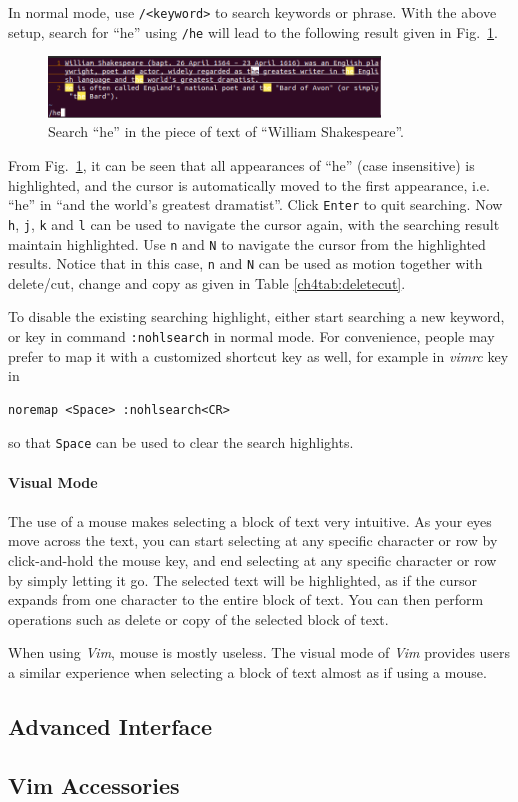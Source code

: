 In normal mode, use \verb|/<keyword>| to search keywords or phrase. With the above setup, search for ``he'' using \verb|/he| will lead to the following result given in Fig.~\ref{ch4fig:vimdemo2}.
\begin{figure}
\centering
\includegraphics[width=250pt]{chapters/chapter4/figures/vimdemo2.png}
\caption{Search ``he'' in the piece of text of ``William Shakespeare''.} \label{ch4fig:vimdemo2}
\end{figure}
From Fig.~\ref{ch4fig:vimdemo2}, it can be seen that all appearances of ``he'' (case insensitive) is highlighted, and the cursor is automatically moved to the first appearance, i.e. ``he'' in ``and the world's greatest dramatist''. Click \verb|Enter| to quit searching. Now \verb|h|, \verb|j|, \verb|k| and \verb|l| can be used to navigate the cursor again, with the searching result maintain highlighted. Use \verb|n| and \verb|N| to navigate the cursor from the highlighted results. Notice that in this case, \verb|n| and \verb|N| can be used as motion together with delete/cut, change and copy as given in Table \ref{ch4tab:deletecut}.

To disable the existing searching highlight, either start searching a new keyword, or key in command \verb|:nohlsearch| in normal mode. For convenience, people may prefer to map it with a customized shortcut key as well, for example in \textit{vimrc} key in
\begin{verbatim}
noremap <Space> :nohlsearch<CR>
\end{verbatim}
so that \verb|Space| can be used to clear the search highlights. 
\\
\\
\noindent \textbf{Visual Mode}
\\
\\
The use of a mouse makes selecting a block of text very intuitive. As your eyes move across the text, you can start selecting at any specific character or row by click-and-hold the mouse key, and end selecting at any specific character or row by simply letting it go. The selected text will be highlighted, as if the cursor expands from one character to the entire block of text. You can then perform operations such as delete or copy of the selected block of text.

When using \textit{Vim}, mouse is mostly useless. The visual mode of \textit{Vim} provides users a similar experience when selecting a block of text almost as if using a mouse. 




\subsection{Advanced Interface}


\subsection{Vim Accessories}



